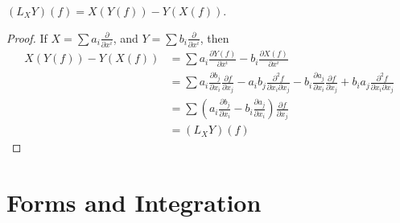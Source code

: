 \begin{theorem}
    $(L_X Y)(f) = X(Y(f)) - Y(X(f))$.
\end{theorem}
\begin{proof}
    If $X = \sum a_i \frac{\partial}{\partial x^i}$, and $Y = \sum b_i \frac{\partial}{\partial x^i}$, then
    \begin{align*} X(Y(f)) - Y(X(f)) &= \sum a_i \frac{\partial Y(f)}{\partial x^i} - b_i \frac{\partial X(f)}{\partial x^i}\\
    &= \sum a_i \frac{\partial b_j}{\partial x_i} \frac{\partial f}{\partial x_j} - a_i b_j \frac{\partial^2 f}{\partial x_i \partial x_j} - b_i \frac{\partial a_j}{\partial x_i} \frac{\partial f}{\partial x_j} + b_i a_j \frac{\partial^2 f}{\partial x_i \partial x_j}\\
    &= \sum \left( a_i \frac{\partial b_j}{\partial x_i} - b_i \frac{\partial a_j}{\partial x_i} \right) \frac{\partial f}{\partial x_j}\\
    &= (L_X Y)(f)
    \end{align*}
\end{proof}


\chapter{Forms and Integration}

